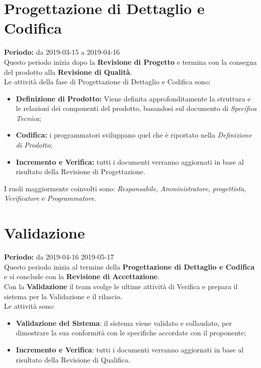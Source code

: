 \section{Progettazione di Dettaglio e Codifica}
\textbf{Periodo:} da 2019-03-15 a 2019-04-16\\
Questo periodo inizia dopo la \textbf{Revisione di Progetto} e termina con la consegna del prodotto alla \textbf{Revisione di Qualità}.\\Le attività della fase di Progettazione di Dettaglio e Codifica sono:
\begin{itemize}
    \item \textbf{Definizione di Prodotto:} Viene definita approfonditamente la struttura e le relazioni dei componenti del prodotto, basandosi sul documento di \textit{Specifica Tecnica};
    \item \textbf{Codifica:} i programmatori sviluppano quel che è riportato nella \textit{Definizione di Prodotto};
    \item \textbf{Incremento e Verifica:} tutti i documenti verranno aggiornati in base al risultato della Revisione di Progettazione.
\end{itemize}
I ruoli maggiormente coinvolti sono: \textit{Responsabile}, \textit{Amministratore}, \textit{progettista}, \textit{Verificatore} e \textit{Programmatore}.

\section{Validazione}
\textbf{Periodo:} da 2019-04-16 2019-05-17\\
Questo periodo inizia al termine della \textbf{Progettazione di Dettaglio e Codifica} e si conclude con la \textbf{Revisione di Accettazione}.\\Con la \textbf{Validazione} il team svolge le ultime attività di Verifica e prepara il sistema per la Validazione e il rilascio.\\
Le attività sono:
\begin{itemize}
    \item \textbf{Validazione del Sistema}: il sistema viene validato e collaudato, per dimostrare la sua conformità con le specifiche accordate con il proponente;
    \item \textbf{Incremento e Verifica}: tutti i documenti verranno aggiornati in base al risultato della Revisione di Qualifica.
\end{itemize}
